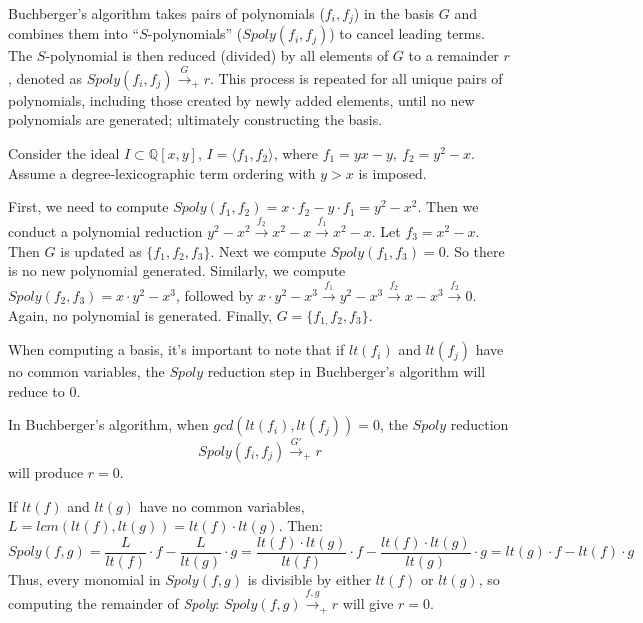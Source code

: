 Buchberger's algorithm takes pairs of polynomials ($f_{i}, f_{j}$) in 
the basis $G$ and combines them into ``$S$-polynomials'' 
($Spoly(f_{i}, f_{j})$) to cancel leading terms. The $S$-polynomial is then 
reduced (divided) by all elements of $G$ to a remainder $r$, denoted as  
$Spoly(f_{i}, f_{j}) \stackrel{G}{\textstyle\longrightarrow}_+r$. This
process is repeated for all unique pairs of polynomials, including
those created by newly added elements, until no new polynomials are
generated; ultimately constructing the \Grobner basis.
\begin{Example}\label{exp:gbsimple}
Consider the ideal $I \subset \mathbb{Q}[x, y]$, $I = \langle f_1, f_2 
\rangle$, where $f_1 = yx - y, ~f_2 = y^2 - x$. 
Assume a degree-lexicographic term ordering with $y > x$ is imposed. 

First, we need to compute $Spoly(f_{1},f_{2})=x\cdot f_{2}-y\cdot f_{1}=y^{2}-x^{2}$.
Then we conduct a polynomial reduction 
$y^{2}-x^{2}\stackrel{f_{2}}{\textstyle\longrightarrow}x^{2}-x \stackrel{f_{1}}{\textstyle\longrightarrow}x^{2}-x$.
Let $f_{3}=x^{2}-x$. Then $G$ is updated as $\{f_{1},f_{2},f_{3}\}$. Next we compute $Spoly(f_{1},f_{3})=0$. So there
is no new polynomial generated. Similarly, we compute $Spoly(f_{2},f_{3})=x\cdot y^{2}-x^{3}$, followed by 
$x\cdot y^{2}-x^{3}\stackrel{f_{1}}{\textstyle\longrightarrow}y^{2}-x^{3} \stackrel{f_{2}}{\textstyle\longrightarrow}x-x^{3}
\stackrel{f_{2}}{\textstyle\longrightarrow}0$. Again, no polynomial is generated. Finally, $G=\{f_{1,}f_{2},f_{3}\}$.

\end{Example}

When computing a \Grobner basis, it's important to note that if $lt(f_i)$ 
and $lt(f_j)$ have no common variables, the $Spoly$ reduction step in 
Buchberger's algorithm will reduce to 0.
\begin{Lemma}
In Buchberger's algorithm, when $gcd(lt(f_i),lt(f_j)) = 0$, the $Spoly$ reduction
$$Spoly(f_{i}, f_{j}) \stackrel{G'}{\textstyle\longrightarrow}_+r$$
will produce $r=0$.
\end{Lemma}

\begin{Proof}
If $lt(f)$ and $lt(g)$ have no common variables,  
$L=lcm(lt(f),lt(g))=lt(f)\cdot lt(g)$. Then: 
\begin{equation}
    Spoly(f,g)=\frac{L}{lt(f)}\cdot f - \frac{L}{lt(g)}\cdot g=
\frac{lt(f)\cdot lt(g)}{lt(f)}\cdot f - \frac{lt(f)\cdot lt(g)}{lt(g)}\cdot g
= lt(g)\cdot f - lt(f)\cdot g \nonumber
\end{equation}
Thus, every monomial in $Spoly(f, g)$ is divisible by either $lt(f)$ 
or $lt(g)$, so computing the remainder of \textit{Spoly}: 
$Spoly(f, g) \stackrel{f,g}{\textstyle\longrightarrow}_+r$ will give $r=0$.
\end{Proof}

